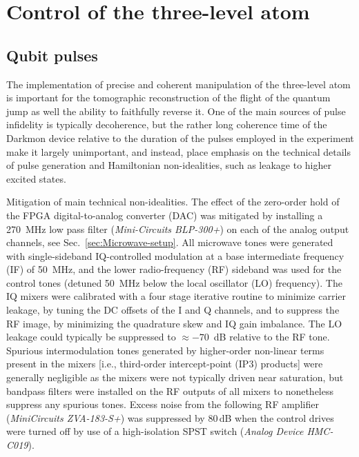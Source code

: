 \section{Control of the three-level atom\label{sec:Control-of-the}}

\subsection{Qubit pulses\label{subsec:Qubit-pulses-calib}}

The implementation of precise and coherent manipulation of the three-level
atom is important for the tomographic reconstruction of the flight
of the quantum jump as well the ability to faithfully reverse it.
One of the main sources of pulse infidelity is typically decoherence,
but the rather long coherence time of the Darkmon device relative
to the duration of the pulses employed in the experiment make it largely
unimportant, and instead, place emphasis on the technical details
of pulse generation and Hamiltonian non-idealities, such as leakage
to higher excited states. 

Mitigation of main technical non-idealities. The effect of the zero-order
hold of the FPGA digital-to-analog converter (DAC) was mitigated by
installing a 270~MHz low pass filter (\textit{Mini-Circuits BLP-300+})
on each of the analog output channels, see Sec.~\ref{sec:Microwave-setup}.
All microwave tones were generated with single-sideband IQ-controlled
modulation at a base intermediate frequency (IF) of 50~MHz, and the
lower radio-frequency (RF) sideband was used for the control tones
(detuned 50~MHz below the local oscillator (LO) frequency). The IQ
mixers were calibrated with a four stage iterative routine to minimize
carrier leakage, by tuning the DC offsets of the I and Q channels,
and to suppress the RF image, by minimizing the quadrature skew and
IQ gain imbalance. The LO leakage could typically be suppressed to
$\approx-70$~dB relative to the RF tone. Spurious intermodulation
tones generated by higher-order non-linear terms present in the mixers
{[}i.e., third-order intercept-point (IP3) products{]} were generally
negligible as the mixers were not typically driven near saturation,
but bandpass filters were installed on the RF outputs of all mixers
to nonetheless suppress any spurious tones. Excess noise from the
following RF amplifier (\textit{MiniCircuits ZVA-183-S+}) was suppressed
by 80\,dB when the control drives were turned off by use of a high-isolation
SPST switch (\textit{Analog Device HMC-C019}).

